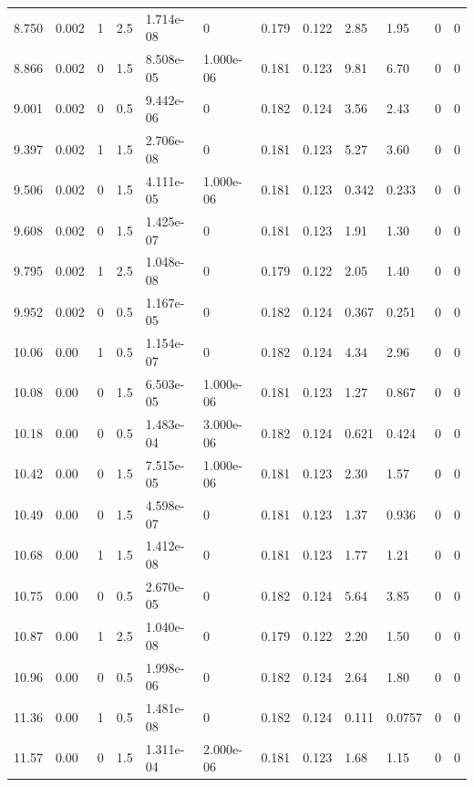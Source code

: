 \documentclass[preview]{standalone}
\begin{document}
{{{\begin{tabular}{L{1.2cm}C{1.2cm} C{0.3cm}C{0.5cm} C{1.4cm}C{1.4cm} C{1.4cm}C{1.4cm} C{1.6cm}C{1.6cm} C{1.6cm}C{1.6cm}}
  8.750  &  0.002  & 1     & 2.5 &  1.714e-08  & 0  &  0.179&   0.122& 2.85 & 1.95   &  0 & 0  \\ 
  8.866  &  0.002  & 0     & 1.5 &  8.508e-05  & 1.000e-06  &  0.181&   0.123& 9.81 & 6.70   &  0 & 0  \\ 
  9.001  &  0.002  & 0     & 0.5 &  9.442e-06  & 0  &  0.182&   0.124& 3.56 & 2.43   &  0 & 0  \\ 
  9.397  &  0.002  & 1     & 1.5 &  2.706e-08  & 0  &  0.181&   0.123& 5.27 & 3.60   &  0 & 0  \\ 
  9.506  &  0.002  & 0     & 1.5 &  4.111e-05  & 1.000e-06  &  0.181&   0.123& 0.342 & 0.233   &  0 & 0  \\ 
  9.608  &  0.002  & 0     & 1.5 &  1.425e-07  & 0  &  0.181&   0.123& 1.91 & 1.30   &  0 & 0  \\ 
  9.795  &  0.002  & 1     & 2.5 &  1.048e-08  & 0  &  0.179&   0.122& 2.05 & 1.40   &  0 & 0  \\ 
  9.952  &  0.002  & 0     & 0.5 &  1.167e-05  & 0  &  0.182&   0.124& 0.367 & 0.251   &  0 & 0  \\ 
  10.06  &  0.00  & 1     & 0.5 &  1.154e-07  & 0  &  0.182&   0.124& 4.34 & 2.96   &  0 & 0  \\ 
  10.08  &  0.00  & 0     & 1.5 &  6.503e-05  & 1.000e-06  &  0.181&   0.123& 1.27 & 0.867   &  0 & 0  \\ 
  10.18  &  0.00  & 0     & 0.5 &  1.483e-04  & 3.000e-06  &  0.182&   0.124& 0.621 & 0.424   &  0 & 0  \\ 
  10.42  &  0.00  & 0     & 1.5 &  7.515e-05  & 1.000e-06  &  0.181&   0.123& 2.30 & 1.57   &  0 & 0  \\ 
  10.49  &  0.00  & 0     & 1.5 &  4.598e-07  & 0  &  0.181&   0.123& 1.37 & 0.936   &  0 & 0  \\ 
  10.68  &  0.00  & 1     & 1.5 &  1.412e-08  & 0  &  0.181&   0.123& 1.77 & 1.21   &  0 & 0  \\ 
  10.75  &  0.00  & 0     & 0.5 &  2.670e-05  & 0  &  0.182&   0.124& 5.64 & 3.85   &  0 & 0  \\ 
  10.87  &  0.00  & 1     & 2.5 &  1.040e-08  & 0  &  0.179&   0.122& 2.20 & 1.50   &  0 & 0  \\ 
  10.96  &  0.00  & 0     & 0.5 &  1.998e-06  & 0  &  0.182&   0.124& 2.64 & 1.80   &  0 & 0  \\ 
  11.36  &  0.00  & 1     & 0.5 &  1.481e-08  & 0  &  0.182&   0.124& 0.111 & 0.0757   &  0 & 0  \\ 
  11.57  &  0.00  & 0     & 1.5 &  1.311e-04  & 2.000e-06  &  0.181&   0.123& 1.68 & 1.15   &  0 & 0  \\ 

\end{tabular}}}}
\end{document}
